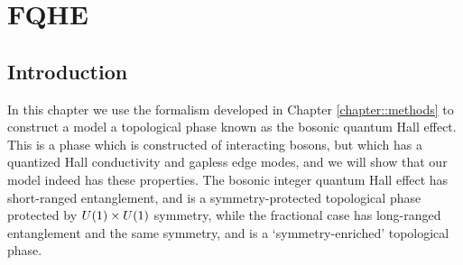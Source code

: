 
\chapter{FQHE}

\section{Introduction}

In this chapter we use the formalism developed in Chapter \ref{chapter::methods} to construct a model a topological phase known as the bosonic quantum Hall effect. This is a phase which is constructed of interacting bosons, but which has a quantized Hall conductivity and gapless edge modes, and we will show that our model indeed has these properties. The bosonic integer quantum Hall effect has short-ranged entanglement, and is a symmetry-protected topological phase protected by $U(1)\times U(1)$ symmetry, while the fractional case has long-ranged entanglement and the same symmetry, and is a `symmetry-enriched' topological phase\cite{EssenHermele}. 

